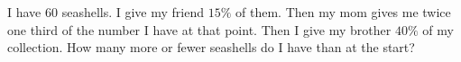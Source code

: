 I have $60$ seashells. I give my friend $15\%$ of them. Then my mom gives me twice one third of the number I have at that point. Then I give my brother $40\%$ of my collection. How many more or fewer seashells do I have than at the start?
